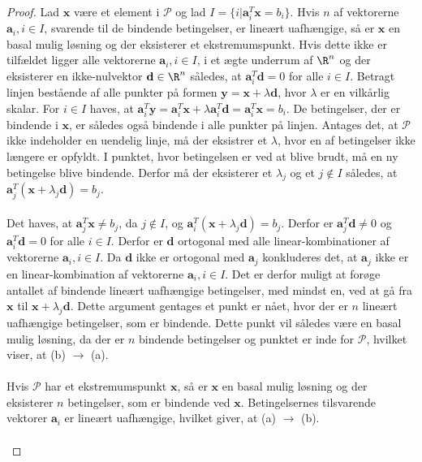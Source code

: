 \begin{proof}
Lad $\textbf{x}$ være et element i $\mathcal{P}$ og lad $I = \{ i| \textbf{a}_i^T\textbf{x} = b_i \}$.
Hvis $n$ af vektorerne  $\textbf{a}_i, i \in I$, svarende til de bindende betingelser, er lineært uafhængige, så er $\textbf{x}$ en basal mulig løsning og der eksisterer et ekstremumspunkt.
Hvis dette ikke er tilfældet ligger alle vektorerne $\textbf{a}_i, i \in I$, i et ægte underrum af $\R^n$ og der eksisterer en ikke-nulvektor $\textbf{d} \in \R^n$ således, at $\textbf{a}_i^T\textbf{d} = 0$ for alle $i \in I$.
Betragt linjen bestående af alle punkter på formen $\textbf{y} = \textbf{x} + \lambda \textbf{d}$, hvor $\lambda$ er en vilkårlig skalar.
For $i \in I$ haves, at $\textbf{a}_i^T\textbf{y} = \textbf{a}_i^T\textbf{x} + \lambda \textbf{a}_i^T\textbf{d} = \textbf{a}_i^T\textbf{x} = b_i$.
De betingelser, der er bindende i $\textbf{x}$, er således også bindende i alle punkter på linjen.
Antages det, at $\mathcal{P}$ ikke indeholder en uendelig linje, må der eksistrer et $\lambda$, hvor en af betingelser ikke længere er opfyldt.
I punktet, hvor betingelsen er ved at blive brudt, må en ny betingelse blive bindende.
Derfor må der eksisterer et $\lambda_j$ og et $j \notin I$ således, at $\textbf{a}_j^T (\textbf{x} + \lambda_j\textbf{d}) = b_j$.\\\\
%
Det haves, at $\textbf{a}_j^T\textbf{x} \neq b_j$, da $j \notin I$, og $\textbf{a}_i^T (\textbf{x} + \lambda_j\textbf{d}) = b_j$.
Derfor er $\textbf{a}_j^T\textbf{d} \neq 0$ og $\textbf{a}_i^T\textbf{d} = 0$ for alle $i \in I$.
Derfor er $\textbf{d}$ ortogonal med alle linear-kombinationer af vektorerne $\textbf{a}_i, i\in I$.
Da $\textbf{d}$ ikke er ortogonal med $\textbf{a}_j$ konkluderes det, at $\textbf{a}_j$ ikke er en linear-kombination af vektorerne $\textbf{a}_i, i \in I$.
Det er derfor muligt at forøge antallet af bindende lineært uafhængige betingelser, med mindst en, ved at gå fra $\textbf{x}$ til $\textbf{x} + \lambda_j\textbf{d}$.
Dette argument gentages et punkt er nået, hvor der er $n$ lineært uafhængige betingelser, som er bindende.
Dette punkt vil således være en basal mulig løsning, da der er $n$ bindende betingelser og punktet er inde for $\mathcal{P}$, hvilket viser, at (b) $\rightarrow$ (a).\\\\
%
Hvis $\mathcal{P}$ har et ekstremumspunkt $\textbf{x}$, så er $\textbf{x}$ en basal mulig løsning og der eksisterer $n$ betingelser, som er bindende ved $\textbf{x}$.
Betingelsernes tilsvarende vektorer $\textbf{a}_i$ er lineært uafhængige, hvilket giver, at (a) $\rightarrow$ (b).\\\\

\end{proof}
